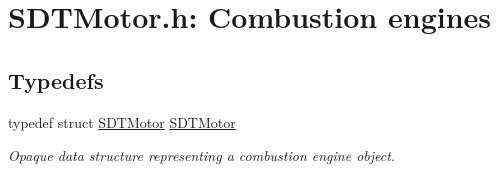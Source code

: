 \hypertarget{group__motor}{}\section{S\+D\+T\+Motor.\+h\+: Combustion engines}
\label{group__motor}
\subsection*{Typedefs}
\begin{DoxyCompactItemize}
\item 
\hypertarget{group__motor_ga71a2e0e68d27c741a163f1b9819acb1b}{}typedef struct \hyperlink{group__motor_ga71a2e0e68d27c741a163f1b9819acb1b}{S\+D\+T\+Motor} \hyperlink{group__motor_ga71a2e0e68d27c741a163f1b9819acb1b}{S\+D\+T\+Motor}\label{group__motor_ga71a2e0e68d27c741a163f1b9819acb1b}

\begin{DoxyCompactList}\small\item\em Opaque data structure representing a combustion engine object. \end{DoxyCompactList}\end{DoxyCompactItemize}
